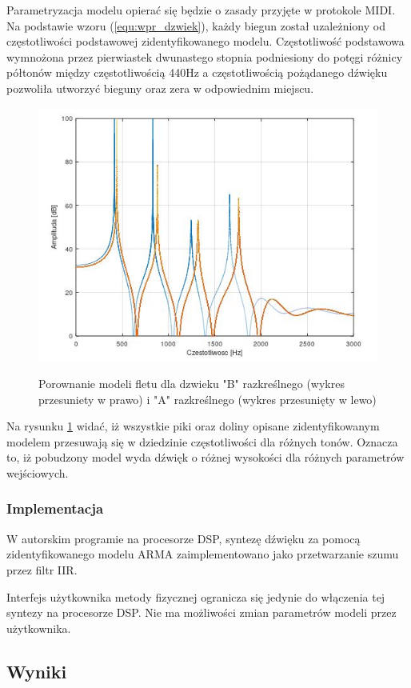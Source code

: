Parametryzacja modelu opierać się będzie o zasady przyjęte w protokole MIDI. 
Na podstawie wzoru (\ref{equ:wpr_dzwiek}), każdy biegun został uzależniony od częstotliwości podstawowej zidentyfikowanego modelu. Częstotliwość podstawowa wymnożona przez pierwiastek dwunastego stopnia podniesiony do potęgi różnicy półtonów między częstotliwością 440Hz a częstotliwością pożądanego dźwięku pozwoliła utworzyć bieguny oraz zera w odpowiednim miejscu.
\begin{figure}[H]
	\centering
	\includegraphics[width=12cm]{grafiki/Model_B_A}
	\label{rys:por_mod_flet}
	\captionsetup{justification=centering}
	\caption{Porownanie modeli fletu dla dzwieku "B" razkreślnego (wykres przesuniety w prawo) i "A" razkreślnego (wykres przesunięty w lewo)}
	\label{rys:por_mod_flet}
\end{figure}
Na rysunku \ref{rys:por_mod_flet} widać, iż wszystkie piki oraz doliny opisane zidentyfikowanym modelem przesuwają się w dziedzinie częstotliwości dla różnych tonów. Oznacza to, iż pobudzony model wyda dźwięk o różnej wysokości dla różnych parametrów wejściowych.


\subsubsection{Implementacja}
W autorskim programie na procesorze DSP, syntezę dźwięku za pomocą zidentyfikowanego modelu ARMA zaimplementowano jako przetwarzanie szumu przez filtr IIR.

Interfejs użytkownika metody fizycznej ogranicza się jedynie do włączenia tej syntezy na procesorze DSP. Nie ma możliwości zmian parametrów modeli przez użytkownika.

\subsection{Wyniki}

